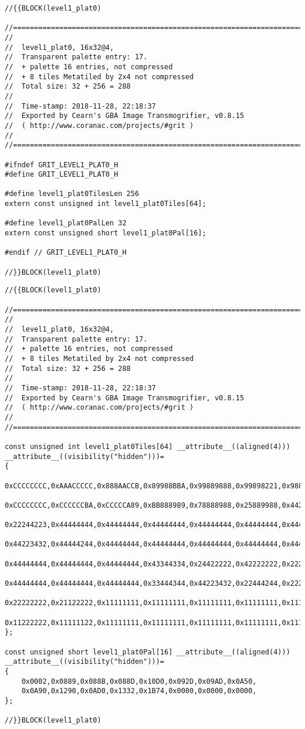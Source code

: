 \begin{lstlisting}[caption={Cabeçalho da parte superior da imagem da plataforma da primeira fase.},label={lst:imageheader}]
//{{BLOCK(level1_plat0)

//======================================================================
//
//  level1_plat0, 16x32@4,
//  Transparent palette entry: 17.
//  + palette 16 entries, not compressed
//  + 8 tiles Metatiled by 2x4 not compressed
//  Total size: 32 + 256 = 288
//
//  Time-stamp: 2018-11-28, 22:18:37
//  Exported by Cearn's GBA Image Transmogrifier, v0.8.15
//  ( http://www.coranac.com/projects/#grit )
//
//======================================================================

#ifndef GRIT_LEVEL1_PLAT0_H
#define GRIT_LEVEL1_PLAT0_H

#define level1_plat0TilesLen 256
extern const unsigned int level1_plat0Tiles[64];

#define level1_plat0PalLen 32
extern const unsigned short level1_plat0Pal[16];

#endif // GRIT_LEVEL1_PLAT0_H

//}}BLOCK(level1_plat0)
\end{lstlisting}

\begin{lstlisting}[caption={\textit{Código fonte} da parte superior da imagem da plataforma da primeira fase.},label={lst:imagecpp}]
//{{BLOCK(level1_plat0)

//======================================================================
//
//  level1_plat0, 16x32@4,
//  Transparent palette entry: 17.
//  + palette 16 entries, not compressed
//  + 8 tiles Metatiled by 2x4 not compressed
//  Total size: 32 + 256 = 288
//
//  Time-stamp: 2018-11-28, 22:18:37
//  Exported by Cearn's GBA Image Transmogrifier, v0.8.15
//  ( http://www.coranac.com/projects/#grit )
//
//======================================================================

const unsigned int level1_plat0Tiles[64] __attribute__((aligned(4))) __attribute__((visibility("hidden")))=
{
    0xCCCCCCCC,0xAAACCCCC,0x888AACCB,0x89988BBA,0x99889888,0x99898221,0x98822222,0x81122444,
    0xCCCCCCCC,0xCCCCCCBA,0xCCCCCA89,0xBB888989,0x78888988,0x25889988,0x44225889,0x22444168,
    0x22244223,0x44444444,0x44444444,0x44444444,0x44444444,0x44444444,0x44444444,0x44444444,
    0x44223432,0x44444244,0x44444444,0x44444444,0x44444444,0x44444444,0x44444444,0x44444444,
    0x44444444,0x44444444,0x44444444,0x43344334,0x24422222,0x42222222,0x22222222,0x22222222,
    0x44444444,0x44444444,0x44444444,0x33444344,0x44223432,0x22444244,0x22222222,0x11222222,
    0x22222222,0x21122222,0x11111111,0x11111111,0x11111111,0x11111111,0x11111111,0x11111111,
    0x11222222,0x11111122,0x11111111,0x11111111,0x11111111,0x11111111,0x11111111,0x11111111,
};

const unsigned short level1_plat0Pal[16] __attribute__((aligned(4))) __attribute__((visibility("hidden")))=
{
    0x0002,0x0889,0x088B,0x088D,0x10D0,0x092D,0x09AD,0x0A50,
    0x0A90,0x1290,0x0AD0,0x1332,0x1B74,0x0000,0x0000,0x0000,
};

//}}BLOCK(level1_plat0)
\end{lstlisting}

